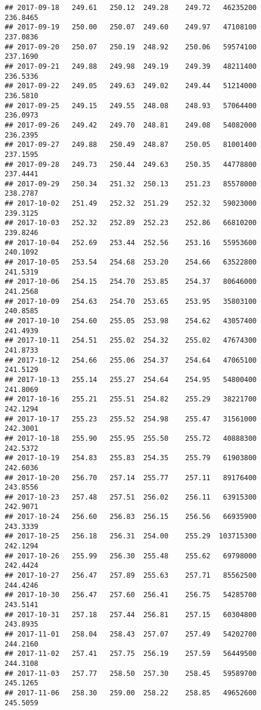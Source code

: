 \documentclass[
]{article}
\begin{document}
\begin{verbatim}
## 2017-09-18   249.61   250.12  249.28    249.72   46235200     236.8465
## 2017-09-19   250.00   250.07  249.60    249.97   47108100     237.0836
## 2017-09-20   250.07   250.19  248.92    250.06   59574100     237.1690
## 2017-09-21   249.88   249.98  249.19    249.39   48211400     236.5336
## 2017-09-22   249.05   249.63  249.02    249.44   51214000     236.5810
## 2017-09-25   249.15   249.55  248.08    248.93   57064400     236.0973
## 2017-09-26   249.42   249.70  248.81    249.08   54082000     236.2395
## 2017-09-27   249.88   250.49  248.87    250.05   81001400     237.1595
## 2017-09-28   249.73   250.44  249.63    250.35   44778800     237.4441
## 2017-09-29   250.34   251.32  250.13    251.23   85578000     238.2787
## 2017-10-02   251.49   252.32  251.29    252.32   59023000     239.3125
## 2017-10-03   252.32   252.89  252.23    252.86   66810200     239.8246
## 2017-10-04   252.69   253.44  252.56    253.16   55953600     240.1092
## 2017-10-05   253.54   254.68  253.20    254.66   63522800     241.5319
## 2017-10-06   254.15   254.70  253.85    254.37   80646000     241.2568
## 2017-10-09   254.63   254.70  253.65    253.95   35803100     240.8585
## 2017-10-10   254.60   255.05  253.98    254.62   43057400     241.4939
## 2017-10-11   254.51   255.02  254.32    255.02   47674300     241.8733
## 2017-10-12   254.66   255.06  254.37    254.64   47065100     241.5129
## 2017-10-13   255.14   255.27  254.64    254.95   54800400     241.8069
## 2017-10-16   255.21   255.51  254.82    255.29   38221700     242.1294
## 2017-10-17   255.23   255.52  254.98    255.47   31561000     242.3001
## 2017-10-18   255.90   255.95  255.50    255.72   40888300     242.5372
## 2017-10-19   254.83   255.83  254.35    255.79   61903800     242.6036
## 2017-10-20   256.70   257.14  255.77    257.11   89176400     243.8556
## 2017-10-23   257.48   257.51  256.02    256.11   63915300     242.9071
## 2017-10-24   256.60   256.83  256.15    256.56   66935900     243.3339
## 2017-10-25   256.18   256.31  254.00    255.29  103715300     242.1294
## 2017-10-26   255.99   256.30  255.48    255.62   69798000     242.4424
## 2017-10-27   256.47   257.89  255.63    257.71   85562500     244.4246
## 2017-10-30   256.47   257.60  256.41    256.75   54285700     243.5141
## 2017-10-31   257.18   257.44  256.81    257.15   60304800     243.8935
## 2017-11-01   258.04   258.43  257.07    257.49   54202700     244.2160
## 2017-11-02   257.41   257.75  256.19    257.59   56449500     244.3108
## 2017-11-03   257.77   258.50  257.30    258.45   59589700     245.1265
## 2017-11-06   258.30   259.00  258.22    258.85   49652600     245.5059

\end{verbatim}
\end{document}
